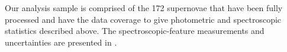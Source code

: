 \documentclass{aastex61}   	%
\begin{document}
Our analysis sample is comprised of the
172
supernovae that have been fully processed and have the data coverage to 
give photometric and spectroscopic statistics described above.
The 
spectroscopic-feature measurements 
\color{red}
and uncertainties
\color{black}
are presented
in \citet{2017Chotard}.
%
%
%
\end{document}
